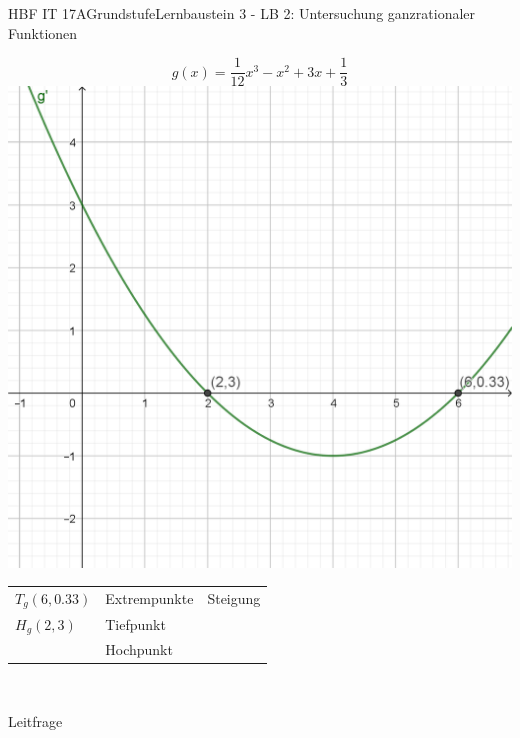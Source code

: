 \documentclass[oneside,openany,headings=optiontotoc,11pt,numbers=noenddot]{scrreprt}
\begin{document}
\begin{worksheet}{HBF IT 17A}{Grundstufe}{Lernbaustein 3 - LB 2: Untersuchung ganzrationaler Funktionen}
\begin{framed}
		\end{framed}
		\newpage
		\setcounter{page}{1}
		\begin{framed}
			\noindent
			\[g(x) = \frac{1}{12}x^3 - x^2 + 3x + \frac{1}{3}\]
			\includegraphics[scale=0.7]{Bilder/HOPTIP_g'.png}
		\end{framed}
		\begin{framed}
			\noindent
			\begin{tabularx}{\textwidth}{XXX}
				\(T_g (6,0.33)\) & Extrempunkte & Steigung\\
				\(H_g (2,3)\) & Tiefpunkt & \\
				 & Hochpunkt\\
				\hline
			\end{tabularx}\\
			\par\noindent
			\tiny{\color{codegray}Leitfrage}\\

\end{framed}
\end{worksheet}
\end{document}
